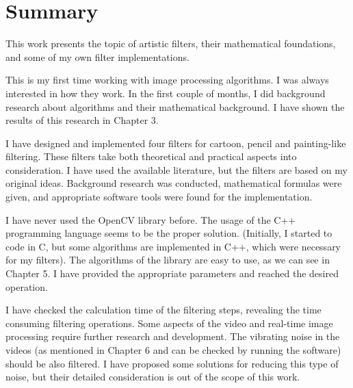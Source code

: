 \documentclass[a4paper,12pt]{article}
\begin{document}
\pagestyle{empty}

\section*{Summary}

This work presents the topic of artistic filters, their mathematical foundations, and some of my own filter implementations. 

This is my first time working with image processing algorithms. I was always interested in how they work. In the first couple of months, I did background research about algorithms and their mathematical background. I have shown the results of this research in Chapter 3. 

I have designed and implemented four filters for cartoon, pencil and painting-like filtering. These filters take both theoretical and practical aspects into consideration. I have used the available literature, but the filters are based on my original ideas. Background research was conducted, mathematical formulas were given, and appropriate software tools were found for the implementation. 

I have never used the OpenCV library before. The usage of the C++ programming language seems to be the proper solution. (Initially, I started to code in C, but some algorithms are implemented in C++, which were necessary for my filters). The algorithms of the library are easy to use, as we can see in Chapter 5. I have provided the appropriate parameters and reached the desired operation. 

I have checked the calculation time of the filtering steps, revealing the time consuming filtering operations. Some aspects of the video and real-time image processing require further research and development. The vibrating noise in the videos (as mentioned in Chapter 6 and can be checked by running the software) should be also filtered. I have proposed some solutions for reducing this type of noise, but their detailed consideration is out of the scope of this work.
\end{document}
